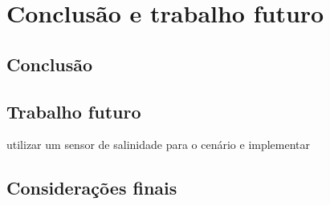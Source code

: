 \chapter{Conclusão e trabalho futuro}


\section{Conclusão}

\section{Trabalho futuro}


utilizar um sensor de salinidade para o cenário e implementar



\section{Considerações finais}